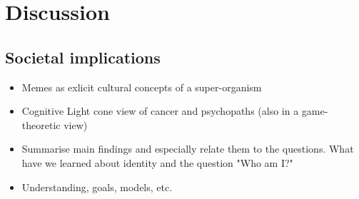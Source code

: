 \chapter{Discussion}
\section{Societal implications}
\begin{itemize}
    \item Memes as exlicit cultural concepts of a super-organism
    \item Cognitive Light cone view of cancer and psychopaths (also in a game-theoretic view)
\end{itemize}

\begin{itemize}
    \item Summarise main findings and especially relate them to the questions. What have we learned about identity and the question "Who am I?"
    \item Understanding, goals, models, etc. 
\end{itemize}
